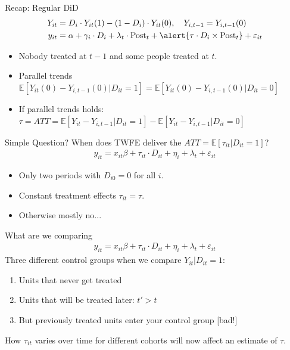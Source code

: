 \documentclass[xcolor=pdftex,dvipsnames,table,mathserif,aspectratio=169]{beamer}
\begin{document}
\begin{frame}{Recap: Regular DiD}
\begin{align*}
Y_{it} &= D_i  \cdot Y_{it}(1) - (1-D_i)\cdot  Y_{it}(0), \quad Y_{i,t-1} = Y_{i,t-1}(0)\\
y_{it} &= \alpha + \gamma_i \cdot D_i + \lambda_t \cdot \text{Post}_t +  \alert{\tau  \cdot D_i \times \text{Post}_t }+ \varepsilon_{it}
\end{align*}
\begin{itemize}
\item Nobody treated at $t-1$ and some people treated at $t$.
\item Parallel trends $\mathbb{E}[Y_{it}(0) - Y_{i,t-1}(0) | D_{it}=1] =\mathbb{E}[Y_{it}(0) - Y_{i,t-1}(0) | D_{it}=0]$
\item If parallel trends holds: $\tau = ATT = \mathbb{E}[Y_{it} - Y_{i,t-1} | D_{it}=1]-\mathbb{E}[Y_{it} - Y_{i,t-1} | D_{it}=0]  $
\end{itemize}
\end{frame}

\begin{frame}{Simple Question?}
When does TWFE deliver the $ATT=\mathbb{E}[\tau_{it} | D_{it}=1]$?
\begin{align*}
y_{it} = x_{it} \beta + \tau_{it} \cdot  D_{it} + \eta_i + \lambda_t + \varepsilon_{it}
\end{align*}
\begin{itemize}
\item Only two periods with $D_{i0}=0$ for all $i$.
\item  Constant treatment effects $\tau_{it} = \tau$.
\item Otherwise mostly no...
\end{itemize}
\end{frame}

\begin{frame}{What are we comparing}
\begin{align*}
y_{it} = x_{it} \beta + \tau_{it} \cdot  D_{it} + \eta_i + \lambda_t + \varepsilon_{it}
\end{align*}
Three different control groups when we compare $Y_{it} | D_{it}=1$:
\begin{enumerate}
\item Units that \alert{never get treated}
\item Units that \alert{will be treated later}: $t' > t$
\item But \alert{previously treated units} enter your control group [bad!]
\end{enumerate}
How $\tau_{it}$ varies over time for different \alert{cohorts} will now affect an estimate of $\tau$.
\end{frame}
\end{document}
